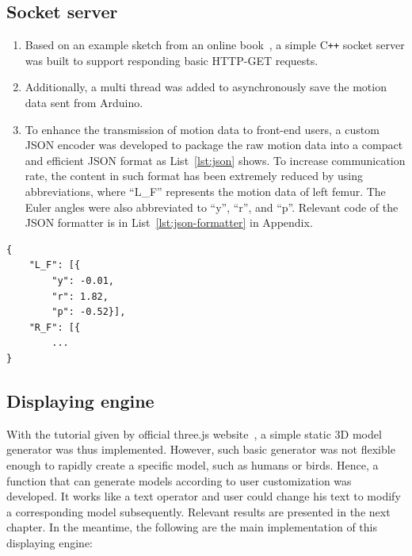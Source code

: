 \subsection{Socket server}
\begin{enumerate}
	\item   Based on an example sketch from an online book~\cite{beej-guide}, a simple C\texttt{++} socket server was built to support responding basic HTTP-GET requests.
	\item   Additionally, a multi thread was added to asynchronously save the motion data sent from Arduino.
	\item   To enhance the transmission of motion data to front-end users, a custom JSON encoder was developed to package the raw motion data into a compact and efficient JSON format as List~\ref{lst:json} shows.
	To increase communication rate, the content in such format has been extremely reduced by using abbreviations, where ``L\_F'' represents the motion data of left femur.
	The Euler angles were also abbreviated to ``y'', ``r'', and ``p''.
	Relevant code of the JSON formatter is in List~\ref{lst:json-formatter} in Appendix.
\end{enumerate}

\lstset{
	language=json,
	numbers=left,
	firstnumber=1
}
\begin{lstlisting}[caption={JSON code sent to front-end client.},label={lst:json}]
{
	"L_F": [{
		"y": -0.01,
		"r": 1.82,
		"p": -0.52}],
	"R_F": [{
		...
}
\end{lstlisting}


\subsection{Displaying engine}\label{subsec:engine}

With the tutorial given by official three.js website~\cite{threejs}, a simple static 3D model generator was thus implemented.
However, such basic generator was not flexible enough to rapidly create a specific model, such as humans or birds.
Hence, a function that can generate models according to user customization was developed.
It works like a text operator and user could change his text to modify a corresponding model subsequently.
Relevant results are presented in the next chapter.
In the meantime, the following are the main implementation of this displaying engine:

